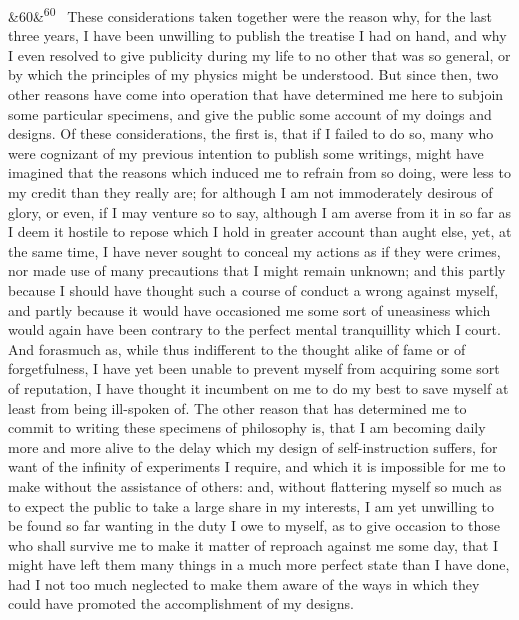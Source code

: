 \documentclass[12pt]{article}
\newcommand{\para}[1][]{\par\noindent\ifx&#1&\else\textsuperscript{\footnotesize #1}~\fi}
\begin{document}
\para[60] These considerations taken together were the reason why, for the last three years, I have been unwilling to publish the treatise I had on hand, and why I even resolved to give publicity during my life to no other that was so general, or by which the principles of my physics might be understood. But since then, two other reasons have come into operation that have determined me here to subjoin some particular specimens, and give the public some account of my doings and designs. Of these considerations, the first is, that if I failed to do so, many who were cognizant of my previous intention to publish some writings, might have imagined that the reasons which induced me to refrain from so doing, were less to my credit than they really are; for although I am not immoderately desirous of glory, or even, if I may venture so to say, although I am averse from it in so far as I deem it hostile to repose which I hold in greater account than aught else, yet, at the same time, I have never sought to conceal my actions as if they were crimes, nor made use of many precautions that I might remain unknown; and this partly because I should have thought such a course of conduct a wrong against myself, and partly because it would have occasioned me some sort of uneasiness which would again have been contrary to the perfect mental tranquillity which I court. And forasmuch as, while thus indifferent to the thought alike of fame or of forgetfulness, I have yet been unable to prevent myself from acquiring some sort of reputation, I have thought it incumbent on me to do my best to save myself at least from being ill-spoken of. The other reason that has determined me to commit to writing these specimens of philosophy is, that I am becoming daily more and more alive to the delay which my design of self-instruction suffers, for want of the infinity of experiments I require, and which it is impossible for me to make without the assistance of others: and, without flattering myself so much as to expect the public to take a large share in my interests, I am yet unwilling to be found so far wanting in the duty I owe to myself, as to give occasion to those who shall survive me to make it matter of reproach against me some day, that I might have left them many things in a much more perfect state than I have done, had I not too much neglected to make them aware of the ways in which they could have promoted the accomplishment of my designs.
\end{document}
